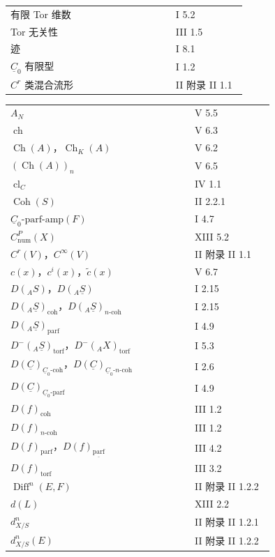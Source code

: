 \begin{longtable}{@{}p{0.65\linewidth}p{0.29\linewidth}@{}}
有限 Tor 维数 & I 5.2\\
Tor 无关性 & III 1.5\\
迹 & I 8.1\\
$\underline C_0$ 有限型 & I 1.2\\[3pt]
$C^r$ 类混合流形 & II 附录 II 1.1
\end{longtable}

\begin{longtable}{@{}p{0.65\linewidth}p{0.29\linewidth}@{}}
$A_N$ & V 5.5\\
$\operatorname{ch}$ & V 6.3\\
$\operatorname{Ch}(A)$，$\operatorname{Ch}_K(A)$ & V 6.2\\
$(\operatorname{Ch}(A))_n$ & V 6.5\\
$\operatorname{cl}_C$ & IV 1.1\\
$\operatorname{Coh}(S)$ & II 2.2.1\\
$\underline C_0\text{-}\mathrm{parf}\text{-}\mathrm{amp}(F)$ & I 4.7\\
$C^P_{\mathrm{num}}(X)$ & XIII 5.2\\
$C^r(V)$，$C^\infty(V)$ & II 附录 II 1.1\\
$c(x)$，$c^i(x)$，$\widetilde c(x)$ & V 6.7\\[3pt]
$D({}_AS)$，$D({}_A\underline S)$ & I 2.15\\
$D({}_A\underline S)_{\mathrm{coh}}$，$D({}_A\underline S)_{n\text{-}\mathrm{coh}}$ & I 2.15\\
$D({}_A\underline S)_{\mathrm{parf}}$ & I 4.9\\
$D^-({}_A\underline S)_{\mathrm{torf}}$，$D^-({}_AX)_{\mathrm{torf}}$ & I 5.3\\
$D(\underline C)_{\underline C_0\text{-}\mathrm{coh}}$，$D(\underline C)_{\underline C_0\text{-}n\text{-}\mathrm{coh}}$ & I 2.6\\
$D(\underline C)_{\underline C_0\text{-}\mathrm{parf}}$ & I 4.9\\
$D(f)_{\mathrm{coh}}$ & III 1.2\\
$D(f)_{n\text{-}\mathrm{coh}}$ & III 1.2\\
$D(f)_{\mathrm{parf}}$，$D(f)_{\underline{\mathrm{parf}}}$ & III 4.2\\
$D(f)_{\mathrm{torf}}$ & III 3.2\\
$\operatorname{Diff}^n(E,F)$ & II 附录 II 1.2.2\\
$d(L)$ & XIII 2.2\\
$d^n_{X/S}$ & II 附录 II 1.2.1\\
$d^n_{X/S}(E)$ & II 附录 II 1.2.2
\end{longtable}

